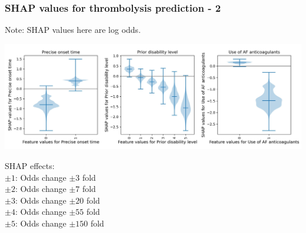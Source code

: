\begin{frame}
\frametitle{SHAP values for thrombolysis prediction - 2}
Note: SHAP values here are log odds. 
\begin{center}
\includegraphics[width=1.0\textwidth]{./images/03d_xgb_10_features_thrombolysis_shap_violin_2.jpg}
\end{center}
\scriptsize
SHAP effects: \\
$\pm1$: Odds change $\pm3$ fold\\
$\pm2$: Odds change $\pm7$ fold\\
$\pm3$: Odds change $\pm20$ fold\\
$\pm4$: Odds change $\pm55$ fold\\
$\pm5$: Odds change $\pm150$ fold
\end{frame}